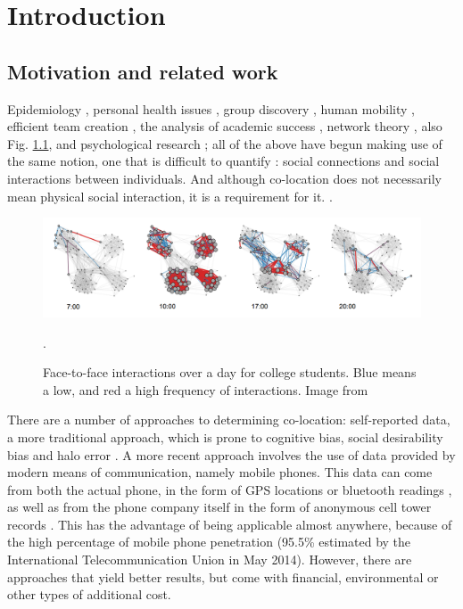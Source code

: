 \chapter{Introduction}

\section{Motivation and related work}



Epidemiology \cite{human_sex}, personal health issues \cite{Madan}, group discovery \cite{5591535}, human mobility \cite{Sun2011929,sevtsuk}, efficient team creation \cite{ECTA, Pentland}, the analysis of academic success \cite{academics}, network theory \cite{networks}, also Fig. \ref{pic:dynamicsf2f}, and psychological research \cite{Rachuri}; all of the above have begun making use of the same notion, one that is difficult to quantify \cite{quant, Wilson}: social connections and social interactions between individuals. And although co-location does not necessarily mean physical social interaction, it is a requirement for it. \cite{Eagle08092009}.

\begin{figure}[h]
	\includegraphics[scale=0.35]{figures/dynamicsf2f.png}
	\caption{Face-to-face interactions over a day for college students. Blue means a low, and red a high frequency of interactions. Image from \protect\cite{Stopczynski}}.
	\label{pic:dynamicsf2f}

\end{figure} 

There are a number of approaches to determining co-location: self-reported data, a more traditional approach, which is prone to cognitive bias, social desirability bias and halo error \cite{Wuchty08092009,gonyea}. A more recent approach involves the use of data provided by modern means of communication, namely mobile phones. This data can come from both the actual phone, in the form of GPS locations or bluetooth readings \cite{Stopczynski}, as well as from the phone company itself in the form of anonymous cell tower records \cite{Onnela01052007, hovel}. This has the advantage of being applicable almost anywhere, because of the high percentage of mobile phone penetration (95.5\% estimated by the International Telecommunication Union in May 2014). 
However, there are approaches that yield better results, but come with financial, environmental or other types of additional cost.

